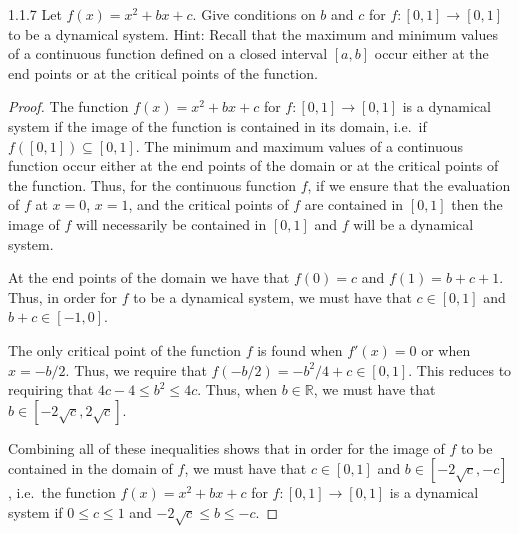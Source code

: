\begin{problem}{1.1.7}
  Let $f(x) = x^2 + bx + c$. Give conditions on $b$ and $c$ for $f: [0, 1] \to [0, 1]$
  to be a dynamical system. Hint: Recall that the maximum and minimum values of
  a continuous function defined on a closed interval $[a, b]$ occur either at
  the end points or at the critical points of the function.
\end{problem}

\begin{proof}
  The function $f(x) = x^2 + bx + c$ for $f: [0, 1] \to [0, 1]$ is a dynamical
  system if the image of the function is contained in its domain, i.e.\ if
  $f([0,1]) \subseteq [0,1]$. The minimum and maximum values of a continuous function
  occur either at the end points of the domain or at the critical points of the function.
  Thus, for the continuous function $f$, if we ensure that the evaluation of $f$ at
  $x=0$, $x=1$, and the critical points of $f$ are contained in $[0, 1]$ then the
  image of $f$ will necessarily be contained in $[0, 1]$ and $f$ will be a
  dynamical system.

  At the end points of the domain we have that $f(0) = c$ and $f(1) = b + c + 1$. Thus, in order for $f$ to be
  a dynamical system, we must have that $c \in [0, 1]$ and $b + c \in [-1, 0]$.

  The only critical point of the function $f$ is found when $f'(x) = 0$ or when $x = -b/2$.
  Thus, we require that $f(-b/2) = -b^2/4 + c \in [0, 1]$. This reduces to
  requiring that $4c - 4 \leq b^2 \leq 4c$.
  Thus, when $b\in\mathbb{R}$, we must have that $b \in [-2\sqrt{c}, 2\sqrt{c}]$.

  Combining all of these inequalities shows that in order for the image of $f$
  to be contained in the domain of $f$, we must have that $c \in [0, 1]$ and $b \in [-2\sqrt{c}, -c]$,
  i.e.\ the function $f(x) = x^2 + bx + c$ for $f: [0, 1] \to [0, 1]$ is a dynamical system if
  $0 \leq c \leq 1$ and $-2\sqrt{c} \leq b \leq -c$.

\end{proof}
\newpage
